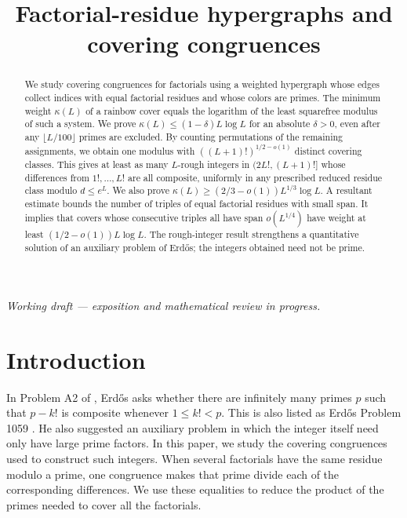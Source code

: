\documentclass[11pt]{amsart}
\title[Factorial-residue hypergraphs]
{Factorial-residue hypergraphs and covering congruences}
\author{}
\date{}
\theoremstyle{definition}
\theoremstyle{remark}
\begin{document}
\begin{abstract}
We study covering congruences for factorials using a weighted hypergraph
whose edges collect indices with equal factorial residues and whose
colors are primes. The minimum
weight $\kappa(L)$ of a rainbow cover equals the logarithm of the least
squarefree modulus of such a system. We prove
$\kappa(L)\leq(1-\delta)L\log L$ for an absolute $\delta>0$, even after
any $\lfloor L/100\rfloor$ primes are excluded. By counting permutations
of the remaining assignments, we obtain one modulus with
$((L+1)!)^{1/2-o(1)}$ distinct covering classes. This gives at least as
many $L$-rough integers in $(2L!,(L+1)!]$ whose differences from
$1!,\ldots,L!$ are all composite, uniformly in any prescribed reduced
residue class modulo $d\leq e^L$. We also prove
$\kappa(L)\geq(2/3-o(1))L^{1/3}\log L$. A resultant estimate bounds
the number of triples of equal factorial residues with small span. It
implies that covers whose consecutive triples all have span
$o(L^{1/4})$ have weight at least $(1/2-o(1))L\log L$.
The rough-integer result strengthens a quantitative solution of an
auxiliary problem of Erd\H{o}s; the integers obtained need not be prime.
\end{abstract}

\maketitle

\begin{center}
\small\textit{Working draft --- exposition and mathematical review in progress.}
\end{center}

\section{Introduction}\label{sec:intro}

In Problem A2 of \cite{Guy}, Erd\H{o}s asks whether there are infinitely
many primes $p$ such that $p-k!$ is composite whenever $1\leq k!<p$.
This is also listed as Erd\H{o}s Problem 1059 \cite{Bloom}. He also
suggested an auxiliary problem in which the integer itself need only
have large prime factors. In this paper, we study the covering
congruences used to construct such integers. When several factorials
have the same residue modulo a prime, one congruence makes that prime
divide each of the corresponding differences. We use these equalities
to reduce the product of the primes needed to cover all the factorials.
\end{document}
